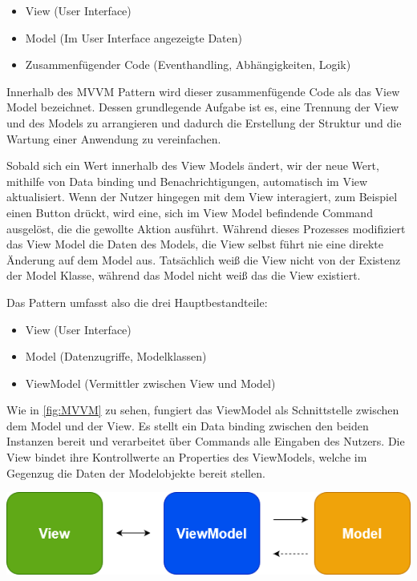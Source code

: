 \begin{itemize}
 	\item View (User Interface)
 	\item Model (Im User Interface angezeigte Daten)
	\item Zusammenfügender Code (Eventhandling, Abhängigkeiten, Logik)
\end{itemize}

Innerhalb des MVVM Pattern wird dieser zusammenfügende Code als das View Model bezeichnet.
Dessen grundlegende Aufgabe ist es, eine Trennung der View und des Models zu arrangieren und dadurch die Erstellung der Struktur  und die Wartung einer Anwendung zu vereinfachen.

Sobald sich ein Wert innerhalb des View Models ändert, wir der neue Wert, mithilfe von Data binding und Benachrichtigungen, automatisch im View aktualisiert.
Wenn der Nutzer hingegen mit dem View interagiert, zum Beispiel einen Button drückt, wird eine, sich im View Model befindende Command ausgelöst, die die gewollte Aktion ausführt.
Während dieses Prozesses modifiziert das View Model die Daten des Models, die View selbst führt nie eine direkte Änderung auf dem Model aus.
Tatsächlich weiß die View nicht von der Existenz der Model Klasse, während das Model nicht weiß das die View existiert.

Das Pattern umfasst also die drei Hauptbestandteile:
\begin{itemize}
 	\item View (User Interface)
 	\item Model (Datenzugriffe, Modelklassen)
	\item ViewModel (Vermittler zwischen View und Model)
\end{itemize}

Wie in \cref{fig:MVVM} zu sehen, fungiert das ViewModel als Schnittstelle zwischen dem Model und der View. Es stellt ein Data binding zwischen den beiden Instanzen bereit und verarbeitet über Commands alle Eingaben des Nutzers.
Die View bindet ihre Kontrollwerte an Properties des ViewModels, welche im Gegenzug die Daten der Modelobjekte bereit stellen.

\begin{center}
  \includegraphics[scale=0.6]{figures/MVVM.PNG}
  \label{fig:MVVM}
\end{center}

